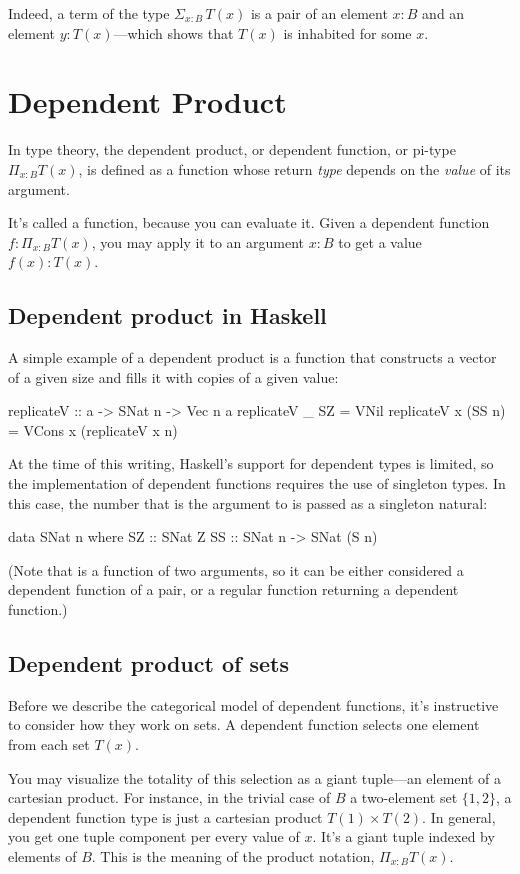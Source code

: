 \documentclass[DaoFP]{subfiles}
\begin{document}
Indeed, a term of the type $\Sigma_{x : B} \, T(x)$ is a pair of an element $x \colon B$ and an element $y \colon T(x)$---which shows that $T(x)$ is inhabited for some $x$.

\section{Dependent Product}

In type theory, the dependent product, or dependent function, or pi-type $\Pi_{x:B} T(x)$, is defined as a function whose return \emph{type} depends on the \emph{value} of its argument. 

It's called a function, because you can evaluate it. Given a dependent function  $f \colon \Pi_{x:B} T(x)$, you may apply it to an argument $x\colon B$ to get a value $f(x) \colon T(x)$.

\subsection{Dependent product in Haskell}
A simple example of a dependent product is a function that constructs a vector of a given size and fills it with copies of a given value:
\begin{haskell}
replicateV :: a -> SNat n -> Vec n a
replicateV _ SZ  = VNil
replicateV x (SS n) = VCons x (replicateV x n)
\end{haskell}

At the time of this writing, Haskell's support for dependent types is limited, so the implementation of dependent functions requires the use of singleton types. In this case, the number that is the argument to  is passed as a singleton natural:
\begin{haskell}
data SNat n where
  SZ :: SNat Z
  SS :: SNat n -> SNat (S n)
\end{haskell}
(Note that  is a function of two arguments, so it can be either considered a dependent function of a pair, or a regular function returning a dependent function.)
\subsection{Dependent product of sets}
Before we describe the categorical model of dependent functions, it's instructive to consider how they work on sets. A dependent function selects one element from each set $T(x)$. 

You may visualize the totality of this selection as a giant tuple---an element of a cartesian product. For instance, in the trivial case of $B$ a two-element set $\{1, 2\}$, a dependent function type is just a cartesian product $T(1) \times T(2)$. In general, you get one tuple component per every value of $x$. It's a giant tuple indexed by elements of $B$. This is the meaning of the product notation, $\Pi_{x:B} T(x)$. 
\end{document}
